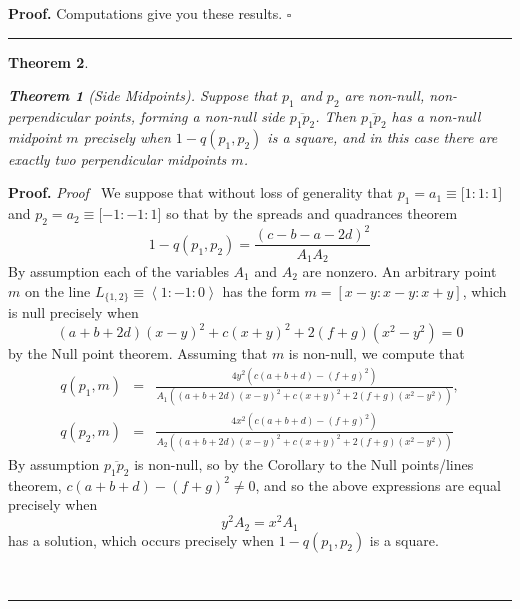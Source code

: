 \documentclass{unswthesis}
\newtheorem{theorem}{Theorem}
\newenvironment{proof}[1][Proof]{\noindent\textbf{#1.} }{\ \rule{0.5em}{0.5em}}
\begin{document}
\begin{proof}
Computations give you these results. $\square $
\end{proof}

\begin{theorem}
\begin{theorem}[Side Midpoints]
Suppose that $p_{1}$ and $p_{2}$ are non-null, non-perpendicular points,
forming a non-null side $\overline{p_{1}p_{2}}$. Then $\overline{p_{1}p_{2}}$
has a non-null midpoint $m$ precisely when $1-q(p_{1},p_{2})$ is a square,
and in this case there are exactly two perpendicular midpoints $m$.
\end{theorem}
\end{theorem}

\begin{proof}
\textit{Proof \ }We suppose that without loss of generality that $%
p_{1}=a_{1}\equiv \lbrack 1:1:1]$ and $p_{2}=a_{2}\equiv \lbrack -1:-1:1]$
so that by the spreads and quadrances theorem%
\begin{equation*}
1-q(p_{1},p_{2})=\frac{(c-b-a-2d)^{2}}{A_{1}A_{2}} 
\end{equation*}%
By assumption each of the variables $A_{1}$ and $A_{2}$ are nonzero. An
arbitrary point $m$ on the line $L_{\{1,2\}}\equiv \left\langle
1:-1:0\right\rangle $ has the form $m=[x-y:x-y:x+y]$, which is null
precisely when 
\begin{equation*}
(a+b+2d)(x-y)^{2}+c(x+y)^{2}+2\left( f+g\right) (x^{2}-y^{2})=0 
\end{equation*}%
by the Null point theorem. Assuming that $m$ is non-null, we compute that%
\begin{eqnarray*}
q(p_{1},m) &=&\frac{4y^{2}\left( c\left( a+b+d\right) -\left( f+g\right)
^{2}\right) }{A_{1}\left( (a+b+2d)(x-y)^{2}+c(x+y)^{2}+2\left( f+g\right)
(x^{2}-y^{2})\right) }, \\
q(p_{2},m) &=&\frac{4x^{2}\left( c\left( a+b+d\right) -\left( f+g\right)
^{2}\right) }{A_{2}\left( (a+b+2d)(x-y)^{2}+c(x+y)^{2}+2\left( f+g\right)
(x^{2}-y^{2})\right) }
\end{eqnarray*}%
\linebreak By assumption $\overline{p_{1}p_{2}}$ is non-null, so by the
Corollary to the Null points/lines theorem, $c\left( a+b+d\right) -\left(
f+g\right) ^{2}\neq 0$, and so the above expressions are equal precisely
when 
\begin{equation*}
y^{2}A_{2}=x^{2}A_{1} 
\end{equation*}%
has a solution, which occurs precisely when $1-q(p_{1},p_{2})$ is a square.

\end{proof}
\end{document}

